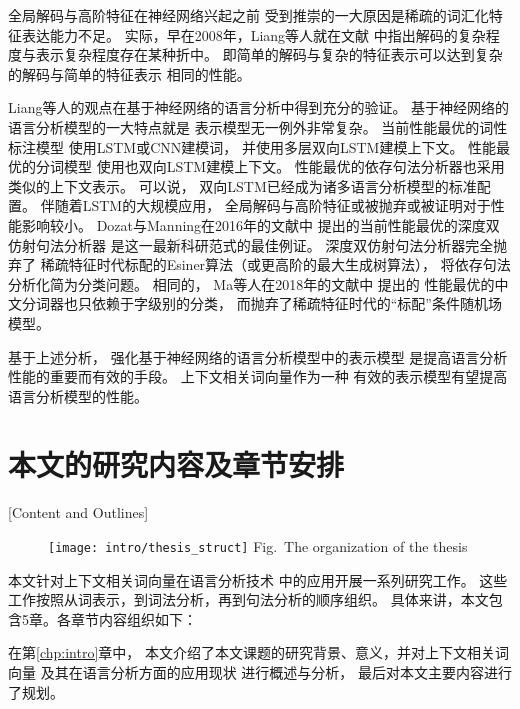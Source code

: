 全局解码与高阶特征在神经网络兴起之前
受到推崇的一大原因是稀疏的词汇化特征表达能力不足。
实际，早在2008年，Liang等人就在文献
中指出解码的复杂程度与表示复杂程度存在某种折中。
即简单的解码与复杂的特征表示可以达到复杂的解码与简单的特征表示
相同的性能。

Liang等人的观点在基于神经网络的语言分析中得到充分的验证。
基于神经网络的语言分析模型的一大特点就是
表示模型无一例外非常复杂。
当前性能最优的词性标注模型\cite{ma-hovy:2016:P16-1,lample-EtAl:2016:N16-1}
使用LSTM或CNN建模词，
并使用多层双向LSTM建模上下文。
性能最优的分词模型\cite{ma-ganchev-weiss:2018:EMNLP}
使用也双向LSTM建模上下文。
性能最优的依存句法分析器\cite{DBLP:journals/corr/DozatM16}也采用类似的上下文表示。
可以说，
双向LSTM已经成为诸多语言分析模型的标准配置。
伴随着LSTM的大规模应用，
全局解码与高阶特征或被抛弃或被证明对于性能影响较小。
Dozat与Manning在2016年的文献中
提出的当前性能最优的深度双仿射句法分析器
是这一最新科研范式的最佳例证。
深度双仿射句法分析器完全抛弃了
稀疏特征时代标配的Esiner算法（或更高阶的最大生成树算法），
将依存句法分析化简为分类问题。
相同的，
Ma等人在2018年的文献中
提出的
性能最优的中文分词器也只依赖于字级别的分类，
而抛弃了稀疏特征时代的``标配''条件随机场模型。

基于上述分析，
强化基于神经网络的语言分析模型中的表示模型
是提高语言分析性能的重要而有效的手段。
上下文相关词向量作为一种
有效的表示模型有望提高
语言分析模型的性能。

\section{本文的研究内容及章节安排}[Content and Outlines]
\begin{figure}[t]
	\centering
	\texttt{[image: intro/thesis\_struct]}
	{Fig.~$\!$}{The organization of the thesis\label{fig:intro:thesis-struct}}
\end{figure}

本文针对上下文相关词向量在语言分析技术
中的应用开展一系列研究工作。
这些工作按照从词表示，到词法分析，再到句法分析的顺序组织。
具体来讲，本文包含5章。各章节内容组织如下：

在第\ref{chp:intro}章中，
本文介绍了本文课题的研究背景、意义，并对上下文相关词向量
及其在语言分析方面的应用现状
进行概述与分析，
最后对本文主要内容进行了规划。

